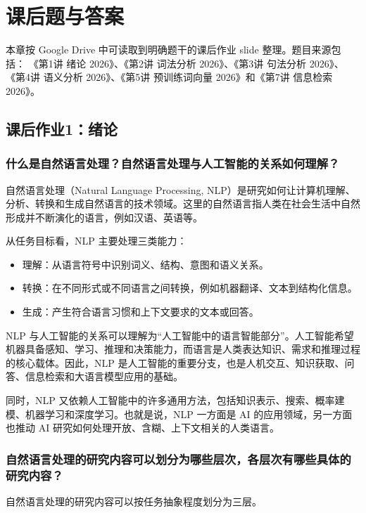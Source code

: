 \chapter{课后题与答案}

本章按 Google Drive 中可读取到明确题干的课后作业 slide 整理。题目来源包括：
《第1讲 绪论 2026》、《第2讲 词法分析 2026》、《第3讲 句法分析 2026》、
《第4讲 语义分析 2026》、《第5讲 预训练词向量 2026》和《第7讲 信息检索 2026》。

\section{课后作业1：绪论}

\subsection{什么是自然语言处理？自然语言处理与人工智能的关系如何理解？}

自然语言处理（Natural Language Processing, NLP）是研究如何让计算机理解、分析、转换和生成自然语言的技术领域。这里的自然语言指人类在社会生活中自然形成并不断演化的语言，例如汉语、英语等。

从任务目标看，NLP 主要处理三类能力：
\begin{itemize}
  \item 理解：从语言符号中识别词义、结构、意图和语义关系。
  \item 转换：在不同形式或不同语言之间转换，例如机器翻译、文本到结构化信息。
  \item 生成：产生符合语言习惯和上下文要求的文本或回答。
\end{itemize}

NLP 与人工智能的关系可以理解为“人工智能中的语言智能部分”。人工智能希望机器具备感知、学习、推理和决策能力，而语言是人类表达知识、需求和推理过程的核心载体。因此，NLP 是人工智能的重要分支，也是人机交互、知识获取、问答、信息检索和大语言模型应用的基础。

同时，NLP 又依赖人工智能中的许多通用方法，包括知识表示、搜索、概率建模、机器学习和深度学习。也就是说，NLP 一方面是 AI 的应用领域，另一方面也推动 AI 研究如何处理开放、含糊、上下文相关的人类语言。

\subsection{自然语言处理的研究内容可以划分为哪些层次，各层次有哪些具体的研究内容？}

自然语言处理的研究内容可以按任务抽象程度划分为三层。

